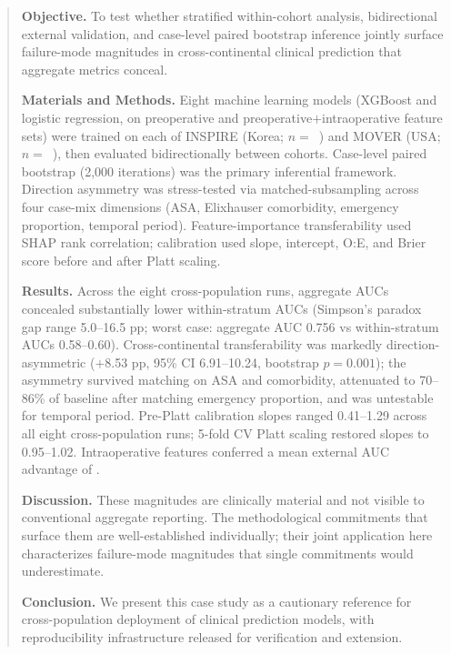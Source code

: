 
\begin{abstract}

\noindent\textbf{Objective.} To test whether stratified within-cohort analysis, bidirectional external validation, and case-level paired bootstrap inference jointly surface failure-mode magnitudes in cross-continental clinical prediction that aggregate metrics conceal.

\vspace{0.5em}
\noindent\textbf{Materials and Methods.} Eight machine learning models (XGBoost and logistic regression, on preoperative and preoperative$+$intraoperative feature sets) were trained on each of INSPIRE (Korea; $n =$~\pnTableOneNInspire) and MOVER (USA; $n =$~\pnTableOneNMover), then evaluated bidirectionally between cohorts. Case-level paired bootstrap (2{,}000 iterations) was the primary inferential framework. Direction asymmetry was stress-tested via matched-subsampling across four case-mix dimensions (ASA, Elixhauser comorbidity, emergency proportion, temporal period). Feature-importance transferability used SHAP rank correlation; calibration used slope, intercept, O:E, and Brier score before and after Platt scaling.

\vspace{0.5em}
\noindent\textbf{Results.} Across the eight cross-population runs, aggregate AUCs concealed substantially lower within-stratum AUCs (Simpson's paradox gap range 5.0--16.5 pp; worst case: aggregate AUC 0.756 vs within-stratum AUCs 0.58--0.60). Cross-continental transferability was markedly direction-asymmetric ($+$8.53 pp, 95\% CI 6.91--10.24, bootstrap $p = 0.001$); the asymmetry survived matching on ASA and comorbidity, attenuated to 70--86\% of baseline after matching emergency proportion, and was untestable for temporal period. Pre-Platt calibration slopes ranged 0.41--1.29 across all eight cross-population runs; 5-fold CV Platt scaling restored slopes to 0.95--1.02. Intraoperative features conferred a mean external AUC advantage of \pnMeanIntraopAdvantageFull.

\vspace{0.5em}
\noindent\textbf{Discussion.} These magnitudes are clinically material and not visible to conventional aggregate reporting. The methodological commitments that surface them are well-established individually; their joint application here characterizes failure-mode magnitudes that single commitments would underestimate.

\vspace{0.5em}
\noindent\textbf{Conclusion.} We present this case study as a cautionary reference for cross-population deployment of clinical prediction models, with reproducibility infrastructure released for verification and extension.

\end{abstract}

